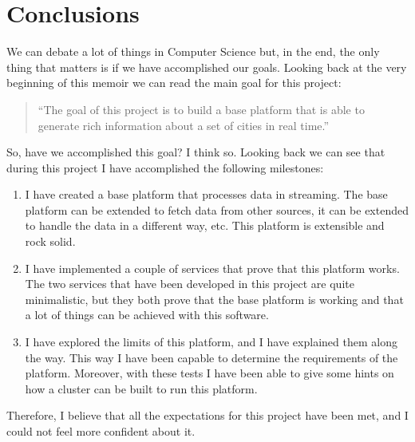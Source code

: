 
\chapter{Conclusions}

We can debate a lot of things in Computer Science but, in the end, the only
thing that matters is if we have accomplished our goals. Looking back at the
very beginning of this memoir we can read the main goal for this project:

\begin{quote}
\centering
  ``The goal of this project is to build a base platform that is able to
generate rich information about a set of cities in real time.''
\end{quote}

So, have we accomplished this goal? I think so. Looking back we can see
that during this project I have accomplished the following milestones:

\begin{enumerate}
  \itemsep0em
  \item I have created a base platform that processes data in streaming. The
base platform can be extended to fetch data from other sources, it can be
extended to handle the data in a different way, etc. This platform is
extensible and rock solid.
  \item I have implemented a couple of services that prove that this platform
works. The two services that have been developed in this project are quite
minimalistic, but they both prove that the base platform is working and that a
lot of things can be achieved with this software.
  \item I have explored the limits of this platform, and I have explained them
along the way. This way I have been capable to determine the requirements of
the platform. Moreover, with these tests I have been able to give some hints on
how a cluster can be built to run this platform.
\end{enumerate}

Therefore, I believe that all the expectations for this project have been
met, and I could not feel more confident about it.
